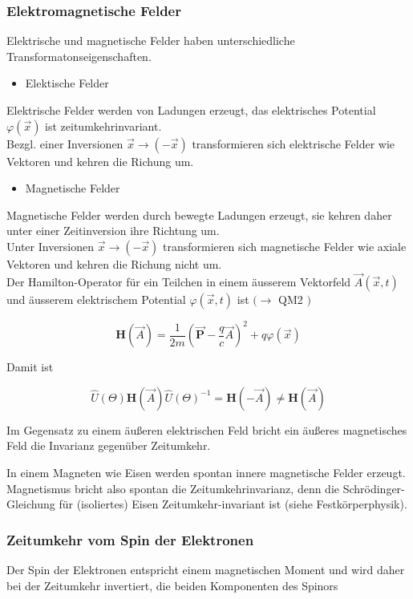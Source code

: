 \documentclass[10pt, letterpaper]{article}
\begin{document}
\subsubsection*{Elektromagnetische Felder}
Elektrische und magnetische Felder haben unterschiedliche Transformatonseigenschaften.

\begin{itemize}
  \item Elektische Felder
\end{itemize}

Elektrische Felder werden von Ladungen erzeugt, das elektrisches Potential $\varphi(\vec{x})$ ist zeitumkehrinvariant.\\
Bezgl. einer Inversionen $\vec{x} \rightarrow(-\vec{x})$ transformieren sich elektrische Felder wie Vektoren und kehren die Richung um.

\begin{itemize}
  \item Magnetische Felder
\end{itemize}

Magnetische Felder werden durch bewegte Ladungen erzeugt, sie kehren daher unter einer Zeitinversion ihre Richtung um.\\
Unter Inversionen $\vec{x} \rightarrow(-\vec{x})$ transformieren sich magnetische Felder wie axiale Vektoren und kehren die Richung nicht um.\\
Der Hamilton-Operator für ein Teilchen in einem äusserem Vektorfeld $\vec{A}(\vec{x}, t)$ und äusserem elektrischem Potential $\varphi(\vec{x}, t)$ ist $(\rightarrow$ QM2 $)$

$$
\mathbf{H}(\vec{A})=\frac{1}{2 m}\left(\overrightarrow{\mathbf{P}}-\frac{q}{c} \vec{A}\right)^{2}+q \varphi(\vec{x})
$$

Damit ist

$$
\widehat{U}(\Theta) \mathbf{H}(\vec{A}) \widehat{U}(\Theta)^{-1}=\mathbf{H}(-\vec{A}) \neq \mathbf{H}(\vec{A})
$$

Im Gegensatz zu einem äußeren elektrischen Feld bricht ein äußeres magnetisches Feld die Invarianz gegenüber Zeitumkehr.

In einem Magneten wie Eisen werden spontan innere magnetische Felder erzeugt. Magnetismus bricht also spontan die Zeitumkehrinvarianz, denn die Schrödinger-Gleichung für (isoliertes) Eisen Zeitumkehr-invariant ist (siehe Festkörperphysik).

\subsubsection*{Zeitumkehr vom Spin der Elektronen}
Der Spin der Elektronen entspricht einem magnetischen Moment und wird daher bei der Zeitumkehr invertiert, die beiden Komponenten des Spinors
\end{document}
